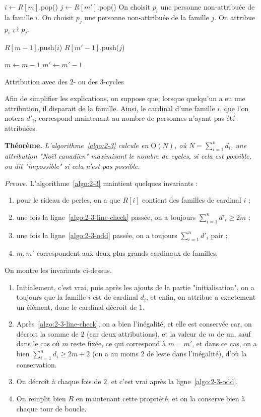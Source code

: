 \documentclass{../../notes}
\begin{document}
\begin{algorithm}[H]
\begin{algorithmic}[1]
       \label{algo:2-3-while-loop}
      \State $i \gets R[m]$.pop()
      \State $j \gets R[m']$.pop()
      \State On choisit $p_i$ une personne non-attribuée de la famille $i$.
      \State On choisit $p_j$ une personne non-attribuée de la famille $j$.
      \State On attribue $p_i \rightleftarrows p_j$.

      \State $R[m - 1]$.push($i$)
      \State $R[m' - 1]$.push($j$)

       $m \gets m - 1$ \EndIf
       $m' \gets m' - 1$ \EndIf
      \EndWhile
    \end{algorithmic}
    \caption{Attribution avec des $2$- ou des $3$-cycles}
    \label{algo:2-3}
  \end{algorithm}
  \showfootnote

  Afin de simplifier les explications, on suppose que, lorsque quelqu'un a eu une attribution, il disparait de la famille.
  Ainsi, le cardinal d'une famille $i$, que l'on notera $d'_i$, correspond maintenant au nombre de personnes n'ayant pas été attribuées.

  \textbf{Théorème.} \textsl{L'algorithme~\ref{algo:2-3} calcule en $\mathrm{O}(N)$, où $N = \sum_{i=1}^n d_i$, une attribution "Noël canadien" maximisant le nombre de cycles, si cela est possible, ou dit "impossible" si cela n'est pas possible.}

  \textit{Preuve.} L'algorithme~\ref{algo:2-3} maintient quelques invariants :
  \begin{enumerate}
    \item pour le rideau de perles, on a que $R[i]$ contient des familles de cardinal $i$ ;
    \item une fois la ligne~\ref{algo:2-3-line-check} passée, on a toujours $\sum_{i=1}^n d'_i \ge 2 m$ ;
    \item une fois la ligne~\ref{algo:2-3-odd} passée, on a toujours $\sum_{i=1}^n d'_i$ pair ;
    \item $m, m'$ correspondent aux deux plus grands cardinaux de familles.
  \end{enumerate}

  On montre les invariants ci-dessus.
  \begin{enumerate}
    \item Initialement, c'est vrai, puis après les ajouts de la partie "initialisation", on a toujours que la famille $i$ est de cardinal $d_i$, et enfin, on attribue a exactement un élément, donc le cardinal décroit de $1$.
    \item Après~\ref{algo:2-3-line-check}, on a bien l'inégalité, et elle est conservée car, on décroit la somme de $2$ (car deux attributions), et la valeur de $m$ de un, sauf dans le cas où $m$ reste fixée, ce qui correspond à $m = m'$, et dans ce cas, on a bien $\sum_{i=1}^n d_i \ge 2m + 2$ (on a au moins $2$ de leste dans l'inégalité), d'où la conservation.
    \item On décroît à chaque fois de $2$, et c'est vrai après la ligne~\ref{algo:2-3-odd}.
    \item On remplit bien $R$ en maintenant cette propriété, et on la conserve bien à chaque tour de boucle.
  \end{enumerate}
\end{document}
